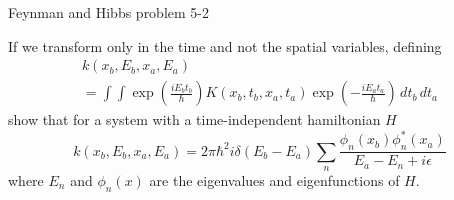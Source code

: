 \documentclass[12pt]{article}
\begin{document}
\begin{center}
Feynman and Hibbs problem 5-2
\end{center}

If we transform only in the time and not the spatial variables,
defining
\begin{multline*}
k(x_b,E_b,x_a,E_a)
\\
=\int\int
\exp\left(\frac{iE_bt_b}{\hbar}\right)
K(x_b,t_b,x_a,t_a)
\exp\left(-\frac{iE_at_a}{\hbar}\right)
\,dt_b\,dt_a
\tag{5.20}
\end{multline*}
%
show that for a system with a time-independent hamiltonian $H$
\begin{equation*}
k(x_b,E_b,x_a,E_a)=2\pi\hbar^2i\delta(E_b-E_a)\sum_n
\frac{\phi_n(x_b)\phi_n^*(x_a)}{E_a-E_n+i\epsilon}
\end{equation*}
%
where $E_n$ and $\phi_n(x)$ are the eigenvalues and eigenfunctions of $H$.
\end{document}
